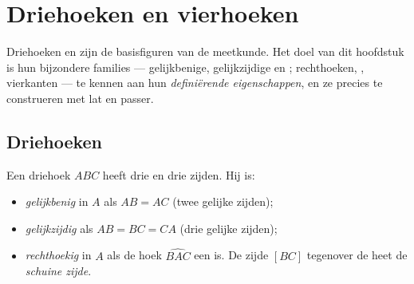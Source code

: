 \chapter{Driehoeken en vierhoeken}\label{ch:g6:shapes}

Driehoeken en  zijn de basisfiguren van de meetkunde. Het doel van
dit hoofdstuk is hun bijzondere families --- gelijkbenige, gelijkzijdige en
; rechthoeken, , vierkanten --- te kennen aan hun
\emph{definiërende eigenschappen}, en ze precies te construeren met lat en
passer.

\section{Driehoeken}

\begin{definition}\label{def:g6:shapes:triangles}
Een driehoek $ABC$ heeft drie  en drie zijden. Hij is:
\begin{itemize}
  \item \emph{gelijkbenig} in $A$ als
        $AB = AC$ (twee gelijke zijden);
  \item \emph{gelijkzijdig} als
        $AB = BC = CA$ (drie gelijke zijden);
  \item \emph{rechthoekig} in $A$ als de hoek
        $\widehat{BAC}$ een  is. De zijde $[BC]$ tegenover de
         heet de \emph{schuine zijde}.
\end{itemize}
\end{definition}

